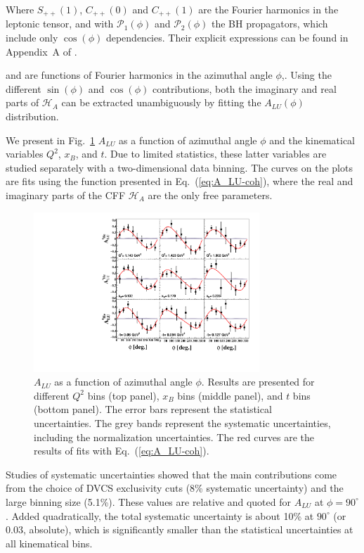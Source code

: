 \documentclass[twocolumn,nofootinbib,showpacs,prl,superscriptaddress,secnumarabic,amssymb,nobibnotes,aps,floatfix]{revtex4}
\begin{document}
Where $S_{++}(1)$, $C_{++}(0)$ and $C_{++}(1)$ are the Fourier harmonics in the 
leptonic tensor, and with ${\mathcal P}_1(\phi)$ and ${\mathcal P}_2(\phi)$ the BH
propagators, which include only $\cos(\phi)$ dependencies. Their explicit 
expressions can be found in Appendix~A of \cite{Armstrong:2017wfw}.  


 and are functions of Fourier harmonics in the 
azimuthal angle $\phi$,. Using the different $\sin(\phi)$ and $\cos(\phi)$ contributions, 
both the imaginary and real parts of $\mathcal{H}_{A}$ can be extracted unambiguously
by fitting the $A_{LU}(\phi)$ distribution.

We present in Fig.~\ref{fig:alu} $A_{LU}$ as a function of azimuthal angle 
$\phi$ and the kinematical variables $Q^2$, $x_B$, and $t$. Due to limited 
statistics, these latter variables are studied separately with a two-dimensional 
data binning. The curves on 
the plots are fits using the function presented in Eq.~(\ref{eq:A_LU-coh}), 
where the real and imaginary parts of the CFF $\mathcal{H}_{A}$ are the only 
free parameters. 

\begin{figure}[tb]
   \centering
\includegraphics[width=8.5cm]{F_Coherent_ALU_phi.pdf}
\caption{$A_{LU}$ as a function of azimuthal angle $\phi$. Results are presented
   for different $Q^{2}$ bins (top panel), $x_{B}$ bins (middle panel), and $t$ 
   bins (bottom panel).  The error bars represent the statistical 
   uncertainties. The grey bands represent the systematic uncertainties, 
   including the normalization uncertainties. The red curves are the results of 
   fits with Eq.~(\ref{eq:A_LU-coh}).}
\label{fig:alu}
\end{figure}

Studies of systematic uncertainties showed that the main contributions 
come from the choice of DVCS exclusivity cuts (8\% systematic uncertainty) and the 
large binning size (5.1\%). These values are relative and quoted for $A_{LU}$
at $\phi=90^\circ$. Added quadratically, the total systematic uncertainty
is about 10\% at $90^\circ$ (or 0.03, absolute), which is significantly smaller
than the statistical uncertainties at all kinematical bins. 
\end{document}
